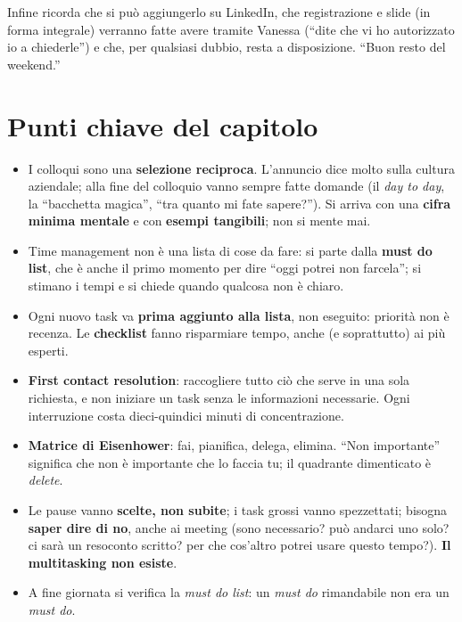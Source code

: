 Infine ricorda che si può aggiungerlo su LinkedIn, che registrazione e slide (in forma integrale) verranno fatte avere
tramite Vanessa (``dite che vi ho autorizzato io a chiederle'') e che, per qualsiasi dubbio, resta a disposizione. ``Buon
resto del weekend.''

\section*{Punti chiave del capitolo}

\begin{itemize}
  \item I colloqui sono una \textbf{selezione reciproca}. L'annuncio dice molto sulla cultura aziendale; alla fine del
        colloquio vanno sempre fatte domande (il \emph{day to day}, la ``bacchetta magica'', ``tra quanto mi fate
        sapere?''). Si arriva con una \textbf{cifra minima mentale} e con \textbf{esempi tangibili}; non si mente mai.
  \item Time management non è una lista di cose da fare: si parte dalla \textbf{must do list}, che è anche il primo
        momento per dire ``oggi potrei non farcela''; si stimano i tempi e si chiede quando qualcosa non è chiaro.
  \item Ogni nuovo task va \textbf{prima aggiunto alla lista}, non eseguito: priorità non è recenza. Le
        \textbf{checklist} fanno risparmiare tempo, anche (e soprattutto) ai più esperti.
  \item \textbf{First contact resolution}: raccogliere tutto ciò che serve in una sola richiesta, e non iniziare un task
        senza le informazioni necessarie. Ogni interruzione costa dieci-quindici minuti di concentrazione.
  \item \textbf{Matrice di Eisenhower}: fai, pianifica, delega, elimina. ``Non importante'' significa che non è importante
        che lo faccia tu; il quadrante dimenticato è \emph{delete}.
  \item Le pause vanno \textbf{scelte, non subite}; i task grossi vanno spezzettati; bisogna \textbf{saper dire di no},
        anche ai meeting (sono necessario? può andarci uno solo? ci sarà un resoconto scritto? per che cos'altro potrei usare
        questo tempo?). \textbf{Il multitasking non esiste}.
  \item A fine giornata si verifica la \emph{must do list}: un \emph{must do} rimandabile non era un \emph{must do}.

\end{itemize}
